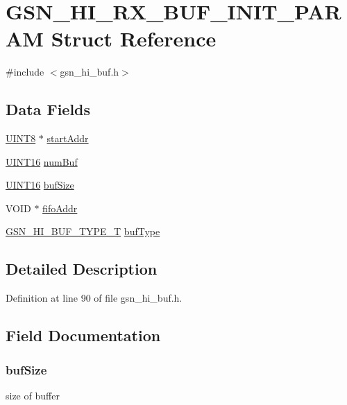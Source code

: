 \hypertarget{a00090}{
\section{GSN\_\-HI\_\-RX\_\-BUF\_\-INIT\_\-PARAM Struct Reference}
\label{a00090}
}


{\ttfamily \#include $<$gsn\_\-hi\_\-buf.h$>$}

\subsection*{Data Fields}
\begin{DoxyCompactItemize}
\item 
\hyperlink{a00660_gab27e9918b538ce9d8ca692479b375b6a}{UINT8} $\ast$ \hyperlink{a00090_a4470f0ec066927d0919c2a5e47a5fa88}{startAddr}
\item 
\hyperlink{a00660_ga09f1a1fb2293e33483cc8d44aefb1eb1}{UINT16} \hyperlink{a00090_a91f4e355e149035efd46658e1b515cea}{numBuf}
\item 
\hyperlink{a00660_ga09f1a1fb2293e33483cc8d44aefb1eb1}{UINT16} \hyperlink{a00090_ad44114ca76468053681bfb486a222ceb}{bufSize}
\item 
VOID $\ast$ \hyperlink{a00090_a9f6314cb2838f0d2e9ac11e3fac3c0b1}{fifoAddr}
\item 
\hyperlink{a00505_a9d5b1f6ad823b77a15f4d0e02f96e4ea}{GSN\_\-HI\_\-BUF\_\-TYPE\_\-T} \hyperlink{a00090_ae00cc8d105d4e28276994f76c089fe90}{bufType}
\end{DoxyCompactItemize}


\subsection{Detailed Description}


Definition at line 90 of file gsn\_\-hi\_\-buf.h.



\subsection{Field Documentation}
\hypertarget{a00090_ad44114ca76468053681bfb486a222ceb}{
\subsubsection[{bufSize}]{ {\bf bufSize}}}
\label{a00090_ad44114ca76468053681bfb486a222ceb}
size of buffer 

